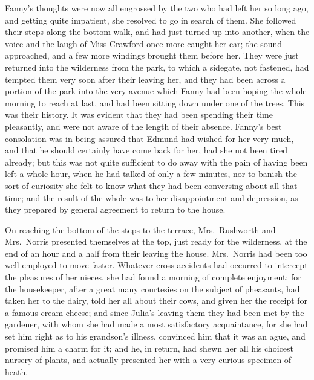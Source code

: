 \documentclass{article}
\begin{document}
Fanny's thoughts were now all engrossed by the two who
had left her so long ago, and getting quite impatient,
she resolved to go in search of them.  She followed
their steps along the bottom walk, and had just turned
up into another, when the voice and the laugh of Miss
Crawford once more caught her ear; the sound approached,
and a few more windings brought them before her.
They were just returned into the wilderness from the park,
to which a sidegate, not fastened, had tempted them very
soon after their leaving her, and they had been across
a portion of the park into the very avenue which Fanny
had been hoping the whole morning to reach at last,
and had been sitting down under one of the trees.
This was their history.  It was evident that they had been
spending their time pleasantly, and were not aware of the
length of their absence.  Fanny's best consolation was
in being assured that Edmund had wished for her very much,
and that he should certainly have come back for her,
had she not been tired already; but this was not quite
sufficient to do away with the pain of having been left
a whole hour, when he had talked of only a few minutes,
nor to banish the sort of curiosity she felt to know
what they had been conversing about all that time;
and the result of the whole was to her disappointment
and depression, as they prepared by general agreement to
return to the house.

On reaching the bottom of the steps to the terrace,
Mrs.\ Rushworth and Mrs.\ Norris presented themselves
at the top, just ready for the wilderness, at the end
of an hour and a half from their leaving the house.
Mrs.\ Norris had been too well employed to move faster.
Whatever cross-accidents had occurred to intercept the pleasures
of her nieces, she had found a morning of complete enjoyment;
for the housekeeper, after a great many courtesies on
the subject of pheasants, had taken her to the dairy,
told her all about their cows, and given her the receipt
for a famous cream cheese; and since Julia's leaving them
they had been met by the gardener, with whom she had made
a most satisfactory acquaintance, for she had set him
right as to his grandson's illness, convinced him that it
was an ague, and promised him a charm for it; and he,
in return, had shewn her all his choicest nursery of plants,
and actually presented her with a very curious specimen
of heath.
\end{document}
